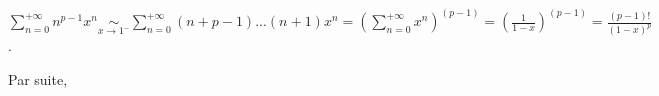 {\begin{enumerate}
{\begin{center}
$\sum_{n=0}^{+\infty}n^{p-1}x^n\underset{x\rightarrow1^-}{\sim}\sum_{n=0}^{+\infty}(n+p-1)...(n+1)x^n =\left(\sum_{n=0}^{+\infty}x^n\right)^{(p-1)}=\left(\frac{1}{1-x}\right)^{(p-1)}=\frac{(p-1)!}{(1-x)^p}$.
\end{center}

Par suite,

\begin{center}
\end{center}}
\end{enumerate}
}
